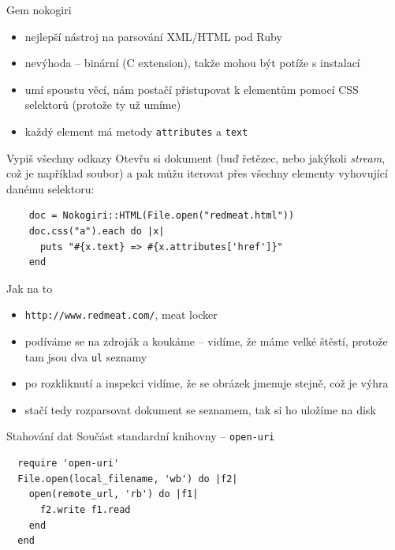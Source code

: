 \documentclass{beamer}
\begin{document}
\begin{frame}{Gem nokogiri}
  \begin{itemize}
    \item nejlepší nástroj na parsování XML/HTML pod Ruby
    \item nevýhoda -- binární (C extension), takže mohou být potíže s instalací
    \item umí spoustu věcí, nám postačí přistupovat k elementům pomocí CSS selektorů (protože ty už umíme)
    \item každý element má metody \texttt{attributes} a \texttt{text}
  \end{itemize}
\end{frame}

\begin{frame}[fragile]{Vypiš všechny odkazy}
  Otevřu si dokument (buď řetězec, nebo jakýkoli \emph{stream}, což je například soubor) a pak můžu iterovat přes všechny elementy vyhovující danému selektoru:
  \scriptsize
  \begin{verbatim}
    doc = Nokogiri::HTML(File.open("redmeat.html"))
    doc.css("a").each do |x|
      puts "#{x.text} => #{x.attributes['href']}"
    end
  \end{verbatim}
\end{frame}

\begin{frame}{Jak na to}
  \begin{itemize}
    \item \texttt{http://www.redmeat.com/}, meat locker
    \item podíváme se na zdroják a koukáme -- vidíme, že máme velké štěstí, protože tam jsou dva \texttt{ul} seznamy
    \item po rozkliknutí a inspekci vidíme, že se obrázek jmenuje stejně, což je výhra
    \item stačí tedy rozparsovat dokument se seznamem, tak si ho uložíme na disk
  \end{itemize}
\end{frame}


\begin{frame}[fragile]{Stahování dat}
  Součást standardní knihovny -- \texttt{open-uri}
  \scriptsize
\begin{verbatim}
  require 'open-uri'
  File.open(local_filename, 'wb') do |f2|
    open(remote_url, 'rb') do |f1|
      f2.write f1.read
    end
  end
\end{verbatim}
\end{frame}
\end{document}
